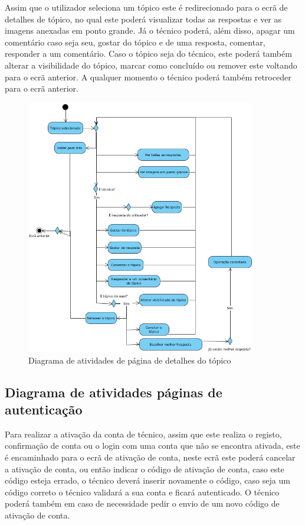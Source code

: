 Assim que o utilizador seleciona um tópico este é redirecionado para o ecrã de detalhes de tópico, 
no qual este poderá visualizar todas as respostas e ver as imagens anexadas em ponto grande.
Já o técnico poderá, além disso, apagar um comentário caso seja seu, gostar do tópico e de uma resposta, 
comentar, responder a um comentário. Caso o tópico seja do técnico, este poderá também alterar a 
visibilidade do tópico, marcar como concluído ou remover este voltando para o ecrã anterior. 
A qualquer momento o técnico poderá também retroceder para o ecrã anterior.

\begin{figure}[htb]
    \centering
    \includegraphics[width=0.9\textwidth]{images/diagramas/atividades/diagrama_atividades_detalhes_topico.png}
    \caption{Diagrama de atividades de página de detalhes do tópico}
    \label{fig:25}
\end{figure}

\newpage

\subsection{Diagrama de atividades páginas de autenticação}

Para realizar a ativação da conta de técnico, assim que este realiza o registo, confirmação de conta ou 
o login com uma conta que não se encontra ativada, este é encaminhado para o ecrã de 
ativação de conta, neste ecrã este poderá cancelar a ativação de conta, ou então indicar o código 
de ativação de conta, caso este código esteja errado, o técnico deverá inserir novamente o código, 
caso seja um código correto o técnico validará a sua conta e ficará autenticado. O técnico poderá 
também em caso de necessidade pedir o envio de um novo código de ativação de conta.

